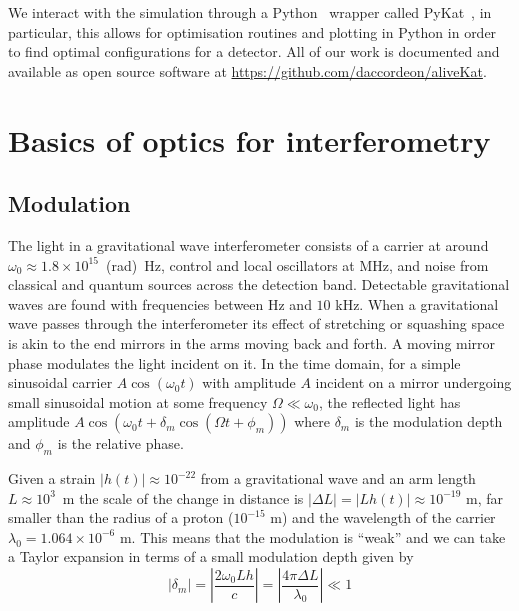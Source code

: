 \documentclass[aps,pra,superscriptaddress,reprint,nofootinbib]{revtex4-1}
\newcommand{\abs}[1]{\left\lvert #1 \right\rvert}
\begin{document}
We interact with the simulation through a Python~\cite{python} wrapper called PyKat~\cite{brown2020pykat}, in particular, this allows for optimisation routines and plotting in Python in order to find optimal configurations for a detector. All of our work is documented and available as open source software at \url{https://github.com/daccordeon/aliveKat}.


\section{Basics of optics for interferometry}
\label{sec:basics}

\subsection{Modulation}

The light in a gravitational wave interferometer consists of a carrier at around $\omega_0 \approx 1.8 \times 10^{15}$~(rad)~Hz, control and local oscillators at MHz, and noise from classical and quantum sources across the detection band. Detectable gravitational waves are found with frequencies between Hz and $10$ kHz. When a gravitational wave passes through the interferometer its effect of stretching or squashing space is akin to the end mirrors in the arms moving back and forth. A moving mirror phase modulates the light incident on it. In the time domain, for a simple sinusoidal carrier $A \cos(\omega_0 t)$ with amplitude $A$ incident on a mirror undergoing small sinusoidal motion at some frequency $\Omega \ll \omega_0$, the reflected light has amplitude $A \cos(\omega_0 t + \delta_m \cos(\Omega t + \phi_m))$ where $\delta_m$ is the modulation depth and $\phi_m$ is the relative phase.


Given a strain $\abs{h(t)} \approx 10^{-22}$ from a gravitational wave and an arm length $L \approx 10^3$~m the scale of the change in distance is $\abs{\Delta L} = \abs{L h(t)} \approx 10^{-19}$ m, far smaller than the radius of a proton ($10^{-15}$ m) and the wavelength of the carrier $\lambda_0 = 1.064 \times 10^{-6}$ m. This means that the modulation is ``weak'' and we can take a Taylor expansion in terms of a small modulation depth given by
\begin{equation}
\abs{\delta_m} = \abs{\frac{2 \omega_0 L h}{c}} = \abs{\frac{4 \pi \Delta L}{\lambda_0}} \ll 1
\end{equation}
\end{document}
